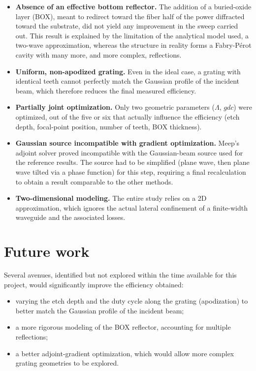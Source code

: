 \documentclass[a4paper,11pt]{report}
\begin{document}
\begin{itemize}
    \item \textbf{Absence of an effective bottom reflector.} The addition of a buried-oxide layer (BOX), meant to redirect toward the fiber half of the power diffracted toward the substrate, did not yield any improvement in the sweep carried out. This result is explained by the limitation of the analytical model used, a two-wave approximation, whereas the structure in reality forms a Fabry-Pérot cavity with many more, and more complex, reflections.
    \item \textbf{Uniform, non-apodized grating.} Even in the ideal case, a grating with identical teeth cannot perfectly match the Gaussian profile of the incident beam, which therefore reduces the final measured efficiency.
    \item \textbf{Partially joint optimization.} Only two geometric parameters ($\Lambda$, $gdc$) were optimized, out of the five or six that actually influence the efficiency (etch depth, focal-point position, number of teeth, BOX thickness).
    \item \textbf{Gaussian source incompatible with gradient optimization.} Meep's adjoint solver proved incompatible with the Gaussian-beam source used for the reference results. The source had to be simplified (plane wave, then plane wave tilted via a phase function) for this step, requiring a final recalculation to obtain a result comparable to the other methods.
    \item \textbf{Two-dimensional modeling.} The entire study relies on a 2D approximation, which ignores the actual lateral confinement of a finite-width waveguide and the associated losses.
\end{itemize}

\section{Future work}

Several avenues, identified but not explored within the time available for this project, would significantly improve the efficiency obtained:

\begin{itemize}
    \item varying the etch depth and the duty cycle along the grating (apodization) to better match the Gaussian profile of the incident beam;
    \item a more rigorous modeling of the BOX reflector, accounting for multiple reflections;
    \item a better adjoint-gradient optimization, which would allow more complex grating geometries to be explored.
\end{itemize}
\end{document}
